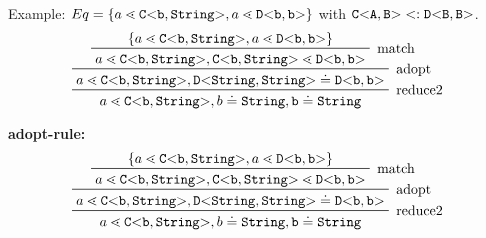 Example:
$Eq = \{ a \lessdot \mathtt{C {\tt <} b,\tt{String} {\tt >} }, a \lessdot \mathtt{D {\tt <} b,b {\tt >} } \}$
with $\mathtt{C {\tt <} A,B {\tt >} } <: \mathtt{D {\tt <} B,B {\tt >} }$.
\begin{displaymath}
\prftree[r]{
    reduce2
        }{
    \prftree[r]{
        adopt
            }{
    \prftree[r]{
        match
            }{
    \set{a \lessdot \exptype{C}{b,\tt{String}}, a \lessdot \exptype{D}{b,b}}
    }{
    a \lessdot \exptype{C}{b,\tt{String}}, \exptype{C}{b,\tt{String}} \lessdot \exptype{D}{b,b}
    }
    }{
         a \lessdot \exptype{C}{b,\tt{String}}, \exptype{D}{\tt{String},\tt{String}} \doteq \exptype{D}{b,b}
    }}
    {
       a \lessdot \exptype{C}{b,\tt{String}}, b \doteq \tt{String}, b \doteq \tt{String}
        }
\end{displaymath}

\textbf{adopt-rule:}\\
\begin{displaymath}
\prftree[r]{
    reduce2
        }{
    \prftree[r]{
        adopt
            }{
    \prftree[r]{
        match
            }{
    \set{a \lessdot \exptype{C}{b,\tt{String}}, a \lessdot \exptype{D}{b,b}}
    }{
    a \lessdot \exptype{C}{b,\tt{String}}, \exptype{C}{b,\tt{String}} \lessdot \exptype{D}{b,b}
    }
    }{
         a \lessdot \exptype{C}{b,\tt{String}}, \exptype{D}{\tt{String},\tt{String}} \doteq \exptype{D}{b,b}
    }}
    {
       a \lessdot \exptype{C}{b,\tt{String}}, b \doteq \tt{String}, b \doteq \tt{String}
        }
\end{displaymath}
